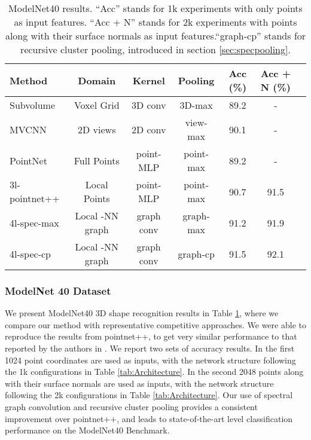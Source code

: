 \documentclass[runningheads]{llncs}
\begin{document}
      
\begin{table}[t]
\renewcommand{\arraystretch}{1.2}
    \centering
        \small
 	\begin{tabular}[width=\linewidth]{l|c|c|c|c|cc}
        \hline
        Method  & Domain & Kernel & Pooling & Acc (\%) & Acc + N (\%) \\
        \hline
Subvolume~\cite{qi2016volumetric} &Voxel Grid & 3D conv & 3D-max  & 89.2  &  - \\
MVCNN~\cite{su2015multi} & 2D views & 2D conv & view-max  & 90.1 &  - \\
        PointNet~\cite{qi2016pointnet} & Full Points& point-MLP &point-max & 89.2 &  -\\ 
        \hline
        \hline
        3l-pointnet++ \cite{qi2017pointnet} & Local Points & point-MLP & point-max  & 90.7 &  91.5\\ 
        4l-spec-max & Local -NN graph & graph conv & graph-max  &  91.2 &  91.9\\
        4l-spec-cp & Local -NN graph & graph conv & graph-cp & 91.5 &  \cellcolor{pink} 92.1\\
        \hline
    \end{tabular}
    
    \vspace{0.2cm}
    \caption{ModelNet40 results. ``Acc'' stands for 1k experiments with only  points as input features. ``Acc + N'' stands for 2k experiments with  points along with their surface normals as input features.``graph-cp'' stands for recursive cluster pooling, introduced in section \ref{sec:specpooling}.
    }
    \label{tab:modelnet40}
    \vspace{-.5cm}
 \end{table}


\subsubsection{ModelNet 40 Dataset}\label{sec:exp_modelnet}
We present ModelNet40 3D shape recognition results in Table \ref{tab:modelnet40}, where we compare our method with representative competitive approaches. We were able to reproduce the results from pointnet++, to get very similar performance to that reported by the authors in \cite{qi2017pointnet}. We report two sets of accuracy results. In the first 1024  point coordinates are used as inputs, with the network structure following the 1k configurations in Table \ref{tab:Architecture}. In the second 2048  points along with their surface normals are used as inputs, with the network structure following the 2k configurations in Table \ref{tab:Architecture}. Our use of spectral graph convolution and recursive cluster pooling provides a consistent improvement over pointnet++, and leads to state-of-the-art level classification performance on the ModelNet40 Benchmark.
\end{document}
